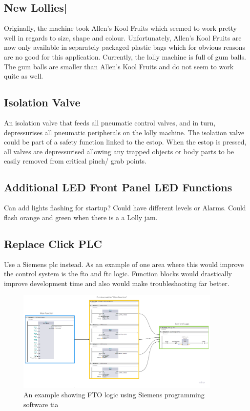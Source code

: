     \subsection{New Lollies|} 
        Originally, the machine took Allen's Kool Fruits which seemed to work pretty well in regards to size, shape and colour. Unfortunately, Allen's Kool Fruits are now only available in separately packaged plastic bags which for obvious reasons are no good for this application. Currently, the lolly machine is full of gum balls. The gum balls are smaller than Allen's Kool Fruits and do not seem to work quite as well. 
    
    \subsection{Isolation Valve} 
        An isolation valve that feeds all pneumatic control valves, and in turn, depressurises all pneumatic peripherals on the lolly machine. The isolation valve could be part of a safety function linked to the \acrshort{estop}. When the \acrshort{estop} is pressed, all valves are depressurised allowing any trapped objects or body parts to be easily removed from critical pinch/ grab points.

    \subsection{Additional 
        LED Front Panel LED Functions} Can add lights flashing for startup? Could have different levels or Alarms. Could flash orange and green when there is a a Lolly jam. 

    \subsection{Replace Click PLC} \label{sec:replacePlc}
        Use a Siemens \acrshort{plc} instead. As an example of one area where this would improve the control system is the \acrshort{fto} and \acrshort{ftc} logic. Function blocks would drastically improve development time and also would make troubleshooting far better. 

        \begin{figure}[H]
            \centering
            \includegraphics[width = 0.9\textwidth]{2_images/ftoFunTia}
            \caption{An example showing FTO logic using Siemens programming software \acrfull{tia}}
            \label{fig:ftoFunTia}
        \end{figure}



